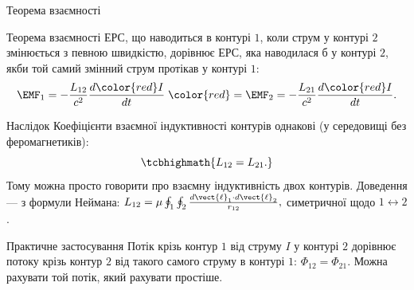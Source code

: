 \documentclass[onlytextwidth]{beamer}
\begin{document}
\begin{frame}{Теорема взаємності}{}
	\begin{block}{Теорема взаємності}\justifying
		ЕРС, що наводиться в контурі $1$, коли струм у контурі $2$ змінюється з певною швидкістю, дорівнює ЕРС, яка наводилася б у контурі $2$,
		якби той самий змінний струм протікав у контурі $1$:
		\begin{equation*}
			\EMF_1 = -\frac{L_{12}}{c^2}\frac{d{\color{red}I}}{dt} \;{\color{red}=}\; \EMF_2 = -\frac{L_{21}}{c^2}\frac{d{\color{red}I}}{dt}.
		\end{equation*}
	\end{block}
	\begin{block}{Наслідок}\justifying
		Коефіцієнти взаємної індуктивності контурів однакові (у середовищі без феромагнетиків):
		\begin{equation*}
			\tcbhighmath{L_{12} = L_{21}.}
		\end{equation*}
		Тому можна просто говорити про взаємну індуктивність двох контурів. Доведення --- з формули Неймана:
		\(
		L_{12} = \mu\oint_1\oint_2 \frac{d\vect{\ell}_1\cdot d\vect{\ell}_2}{r_{12}},
		\)
		симетричної щодо $1 \leftrightarrow 2$.
	\end{block}
	\begin{block}{Практичне застосування}\justifying\small
		Потік крізь контур $1$ від струму $I$ у контурі $2$ дорівнює потоку крізь контур $2$ від такого самого струму в контурі $1$:
		$\Phi_{12} = \Phi_{21}$. Можна рахувати той потік, який рахувати простіше.
	\end{block}
\end{frame}
\end{document}
